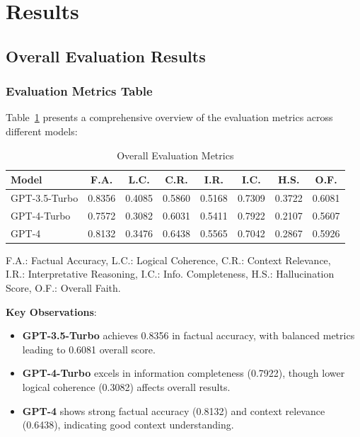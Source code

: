 \section{Results}

\subsection{Overall Evaluation Results}

\subsubsection{Evaluation Metrics Table}
Table~\ref{tab:results_overall_metrics} presents a comprehensive overview of the evaluation metrics across different models:

\begin{table}[!htbp]
\centering
\caption{Overall Evaluation Metrics}
\label{tab:results_overall_metrics}
\small
\begin{tabular}{|l|c|c|c|c|c|c|c|}
\hline
\textbf{Model} & \textbf{F.A.} & \textbf{L.C.} & \textbf{C.R.} & \textbf{I.R.} 
& \textbf{I.C.} & \textbf{H.S.} & \textbf{O.F.} \\
\hline
GPT-3.5-Turbo & 0.8356 & 0.4085 & 0.5860 & 0.5168 & 0.7309 & 0.3722 & 0.6081 \\
GPT-4-Turbo & 0.7572 & 0.3082 & 0.6031 & 0.5411 & 0.7922 & 0.2107 & 0.5607 \\
GPT-4 & 0.8132 & 0.3476 & 0.6438 & 0.5565 & 0.7042 & 0.2867 & 0.5926 \\
\hline
\end{tabular}
\begin{flushleft}
\small
F.A.: Factual Accuracy, L.C.: Logical Coherence, C.R.: Context Relevance,\\
I.R.: Interpretative Reasoning, I.C.: Info. Completeness, H.S.: Hallucination Score, O.F.: Overall Faith.
\end{flushleft}
\end{table}

\textbf{Key Observations}:
\begin{itemize}
    \item \textbf{GPT-3.5-Turbo} achieves 0.8356 in factual accuracy, with 
    balanced metrics leading to 0.6081 overall score.
    
    \item \textbf{GPT-4-Turbo} excels in information completeness (0.7922), 
    though lower logical coherence (0.3082) affects overall results.
    
    \item \textbf{GPT-4} shows strong factual accuracy (0.8132) and context 
    relevance (0.6438), indicating good context understanding.
\end{itemize}

